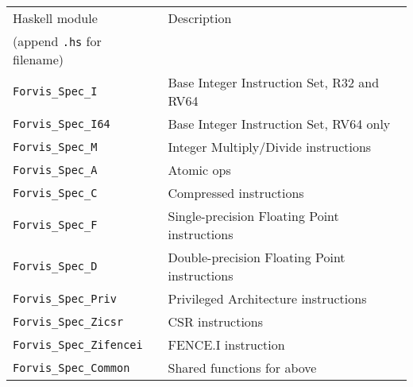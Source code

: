 \documentclass[11pt]{article}
\begin{document}
\begin{center}
\begin{tabular}{|l|l|}
\hline
Haskell module                  & Description \\
(append {\tt .hs} for filename) & \\
\hline
\hline
{\tt Forvis\_Spec\_I}        & Base Integer Instruction Set, R32 and RV64 \\
\hline
{\tt Forvis\_Spec\_I64}      & Base Integer Instruction Set, RV64 only \\
\hline
{\tt Forvis\_Spec\_M}        & Integer Multiply/Divide instructions \\
\hline
{\tt Forvis\_Spec\_A}        & Atomic ops \\
\hline
{\tt Forvis\_Spec\_C}        & Compressed instructions \\
\hline
{\tt Forvis\_Spec\_F}        & Single-precision Floating Point instructions \\
\hline
{\tt Forvis\_Spec\_D}        & Double-precision Floating Point instructions \\
\hline
{\tt Forvis\_Spec\_Priv}     & Privileged Architecture instructions \\
\hline
{\tt Forvis\_Spec\_Zicsr}    & CSR instructions \\
\hline
{\tt Forvis\_Spec\_Zifencei} & FENCE.I instruction \\
\hline
\hline
{\tt Forvis\_Spec\_Common}   & Shared functions for above \\
\hline
\end{tabular}
\end{center}
\end{document}
